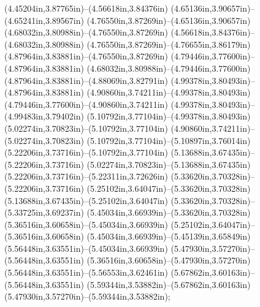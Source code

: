(4.45204in,3.87765in)--(4.56618in,3.84376in) (4.65136in,3.90657in)--(4.65241in,3.89567in) (4.76550in,3.87269in)--(4.65136in,3.90657in) (4.68032in,3.80988in)--(4.76550in,3.87269in) (4.56618in,3.84376in)--(4.68032in,3.80988in) (4.76550in,3.87269in)--(4.76655in,3.86179in) (4.87964in,3.83881in)--(4.76550in,3.87269in) (4.79446in,3.77600in)--(4.87964in,3.83881in) (4.68032in,3.80988in)--(4.79446in,3.77600in) (4.87964in,3.83881in)--(4.88069in,3.82791in) (4.99378in,3.80493in)--(4.87964in,3.83881in) (4.90860in,3.74211in)--(4.99378in,3.80493in) (4.79446in,3.77600in)--(4.90860in,3.74211in) (4.99378in,3.80493in)--(4.99483in,3.79402in) (5.10792in,3.77104in)--(4.99378in,3.80493in) (5.02274in,3.70823in)--(5.10792in,3.77104in) (4.90860in,3.74211in)--(5.02274in,3.70823in) (5.10792in,3.77104in)--(5.10897in,3.76014in) (5.22206in,3.73716in)--(5.10792in,3.77104in) (5.13688in,3.67435in)--(5.22206in,3.73716in) (5.02274in,3.70823in)--(5.13688in,3.67435in) (5.22206in,3.73716in)--(5.22311in,3.72626in) (5.33620in,3.70328in)--(5.22206in,3.73716in) (5.25102in,3.64047in)--(5.33620in,3.70328in) (5.13688in,3.67435in)--(5.25102in,3.64047in) (5.33620in,3.70328in)--(5.33725in,3.69237in) (5.45034in,3.66939in)--(5.33620in,3.70328in) (5.36516in,3.60658in)--(5.45034in,3.66939in) (5.25102in,3.64047in)--(5.36516in,3.60658in) (5.45034in,3.66939in)--(5.45139in,3.65849in) (5.56448in,3.63551in)--(5.45034in,3.66939in) (5.47930in,3.57270in)--(5.56448in,3.63551in) (5.36516in,3.60658in)--(5.47930in,3.57270in) (5.56448in,3.63551in)--(5.56553in,3.62461in) (5.67862in,3.60163in)--(5.56448in,3.63551in) (5.59344in,3.53882in)--(5.67862in,3.60163in) (5.47930in,3.57270in)--(5.59344in,3.53882in);

